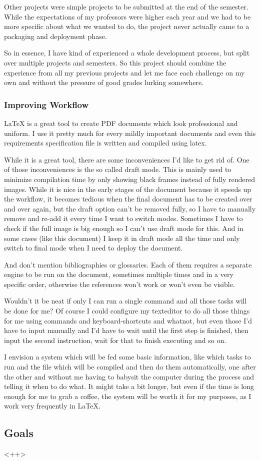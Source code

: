 \documentclass[a4paper, draft, 12pt]{scrartcl}
\begin{document}
Other projects were simple projects to be submitted at the end of the semester.
While the expectations of my professors were higher each year and we had to be
more specific about what we wanted to do, the project never actually came to a
packaging and deployment phase.

So in essence, I have kind of experienced a whole development process, but
split over multiple projects and semesters. So this project should combine the
experience from all my previous projects and let me face each challenge on my
own and without the pressure of good grades lurking somewhere.

\subsubsection*{Improving Workflow}
{\LaTeX} is a great tool to create PDF documents which look professional
and uniform. I use it pretty much for every mildly important documents and
even this requirements specification file is written and compiled using latex.

While it is a great tool, there are some inconveniences I'd like to get rid of.
One of those inconveniences is the so called {\glqq draft mode\grqq}. This is
mainly used to minimize compilation time by only showing black frames instead
of fully rendered images. While it is nice in the early stages of the document
because it speeds up the workflow, it becomes tedious when the final document
has to be created over and over again, but the draft option can't be removed 
fully, so I have to manually remove and re-add it every time I want to switch
modes. Sometimes I have to check if the full image is big enough so I can't
use draft mode for this. And in some cases (like this document) I keep it in
draft mode all the time and only switch to final mode when I need to deploy the
document.

And don't mention bibliographies or glossaries. Each of them requires a
separate engine to be run on the document, sometimes multiple times and in a
very specific order, otherwise the references won't work or won't even be
visible.

Wouldn't it be neat if only I can run a single command and all those tasks will
be done for me? Of course I could configure my texteditor to do all those
things for me using commands and keyboard-shortcuts and whatnot, but even those
I'd have to input manually and I'd have to wait until the first step is
finished, then input the second instruction, wait for that to finish executing
and so on.

I envision a system which will be fed some basic information, like which tasks
to run and the file which will be compiled and then do them automatically, one
after the other and without me having to babysit the computer during the
process and telling it when to do what. It might take a bit longer, but even if
the time is long enough for me to grab a coffee, the system will be worth it
for my purposes, as I work very frequently in {\LaTeX}.


\subsection{Goals}\label{sec:goals}
<++>
\end{document}
